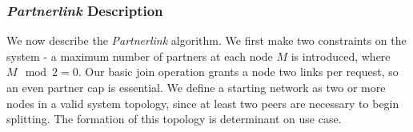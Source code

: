 \documentclass[12pt,a4paper]{article}
\begin{document}
\subsubsection{\textit{Partnerlink} Description} \label{css:partnerlink:description}
We now describe the \textit{Partnerlink} algorithm. We first make two constraints on the system - a maximum number of partners at each node \(M\) is introduced, where \(M\mod{2} = 0\). Our basic join operation grants a node two links per request, so an even partner cap is essential. We define a starting network as two or more nodes in a valid system topology, since at least two peers are necessary to begin splitting. The formation of this topology is determinant on use case.

\end{document}

